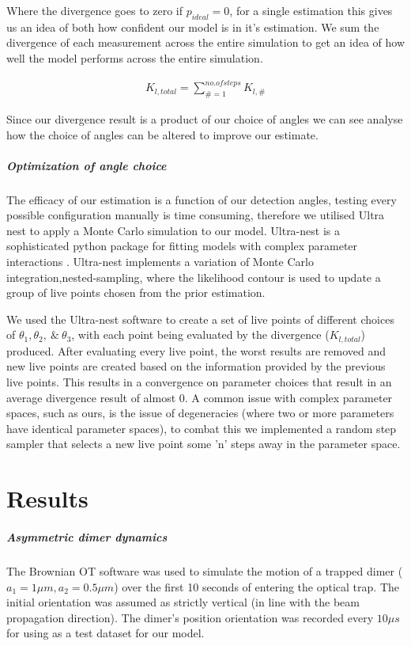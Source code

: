 \documentclass[11pt]{article}
\begin{document}
	Where the divergence goes to zero if $p_{ideal}=0$, for a single estimation this gives us an idea of both how confident our model is in it's estimation. We sum the divergence of each measurement across the entire simulation to get an idea of how well the model performs across the entire simulation. 
	
	\begin{align}
		K_{l,total} = \sum\limits_{\# =1}^{no. of steps} K_{l,\#}
	\end{align}

	Since our divergence result is a product of our choice of angles we can see analyse how the choice of angles can be altered to improve our estimate.   

	\subparagraph*{Optimization of angle choice}
	The efficacy of our estimation is a function of our detection angles, testing every possible configuration manually is time consuming, therefore we utilised Ultra nest to apply a Monte Carlo simulation to our model. Ultra-nest is a sophisticated python package for fitting models with complex parameter interactions \cite{Ultranest}. Ultra-nest implements a variation of Monte Carlo integration,nested-sampling, where the likelihood contour is used to update a group of live points chosen from the prior estimation.
	
	We used the Ultra-nest software to create a set of live points of different choices of $\theta_1, \theta_2, \ \& \ \theta_3$, with each point being evaluated by the divergence ($K_{l, total}$) produced. After evaluating every live point, the worst results are removed and new live points are created based on the information provided by the previous live points. This results in a convergence on parameter choices that result in an average divergence result of almost 0. A common issue with complex parameter spaces, such as ours, is the issue of degeneracies (where two or more parameters have identical parameter spaces), to combat this we implemented a random step sampler that selects a new live point some 'n' steps away in the parameter space.
	
	\section*{Results}
	\subparagraph*{Asymmetric dimer dynamics}
	The Brownian OT software was used to simulate the motion of a trapped dimer ($a_1=1\mu m, a_2=0.5\mu m$) over the first 10 seconds of entering the optical trap. The initial orientation was assumed as strictly vertical (in line with the beam propagation direction). The dimer's position orientation was recorded every $10 \mu s$ for using as a test dataset for our model. 
	
\end{document}
